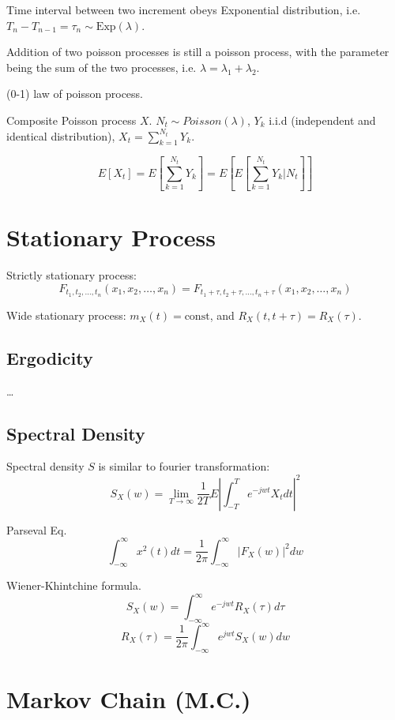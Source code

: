 Time interval between two increment obeys Exponential distribution, i.e.
$T_n - T_{n-1} = \tau_n \sim \text{Exp}(\lambda)$.

Addition of two poisson processes is still a poisson process, with the parameter
being the sum of the two processes, i.e. $\lambda = \lambda_1 + \lambda_2$.

(0-1) law of poisson process.

Composite Poisson process $X$. $N_t\sim Poisson(\lambda)$, $Y_k$ i.i.d (independent
and identical distribution), $X_t=\sum_{k=1}^{N_t} Y_k$.

$$E[X_t] = E[\sum_{k=1}^{N_t} Y_k] = E[E[\sum_{k=1}^{N_t} Y_k | N_t]]$$

\section{Stationary Process}

Strictly stationary process:
$$F_{t_1,t_2,\ldots,t_n}(x_1,x_2,\ldots,x_n) = F_{t_1+\tau,t_2+\tau,\ldots,t_n+\tau}(x_1,x_2,\ldots,x_n)$$

Wide stationary process: $m_X(t) = \text{const}$, and $R_X(t, t+\tau) = R_X(\tau)$.

\subsection{Ergodicity}

\ldots

\subsection{Spectral Density}

Spectral density $S$ is similar to fourier transformation:
$$S_X(w) = \lim_{T\rightarrow\infty} \frac{1}{2T} E|\int_{-T}^T e^{-jwt}X_t dt|^2$$

Parseval Eq.
$$\int_{-\infty}^\infty x^2(t)dt = \frac{1}{2\pi} \int_{-\infty}^\infty |F_X(w)|^2 dw$$

Wiener-Khintchine formula.
$$S_X(w) = \int_{-\infty}^\infty e^{-jwt}R_X(\tau)d\tau$$
$$R_X(\tau) = \frac{1}{2\pi} \int_{-\infty}^\infty e^{jwt}S_X(w)dw$$

\section{Markov Chain (M.C.)}


